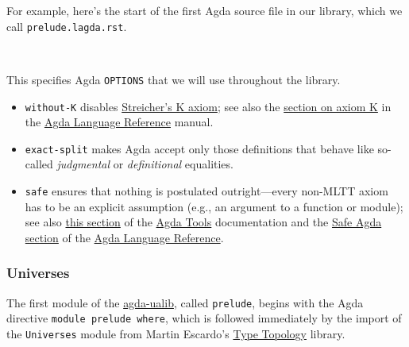 \documentclass[sigplan,screen]{acmart}
\newcommand{\agdaualib}{\href{https://ualib.org}{agda-ualib}\xspace}
\newcommand{\agdaualib}{\href{anonymizedLink/agda-ualib.html}{agda-ualib}\xspace}
\begin{document}
For example, here's the start of the first Agda source file in our library, which we call \texttt{prelude.lagda.rst}.
\begin{code}
\\[\AgdaEmptyExtraSkip]%
\>[0]\AgdaSymbol{\{-\#}\AgdaSpace{}%
\AgdaSpace{}%
\AgdaSpace{}%
\AgdaSpace{}%
\AgdaSpace{}%
\AgdaSymbol{\#-\}}\<%
\end{code}
This specifies Agda \texttt{OPTIONS} that we will use throughout the library.
\begin{itemize}
\item \texttt{without-K} disables \href{https://ncatlab.org/nlab/show/axiom+K+\%28type+theory\%29}{Streicher's K axiom}; see also the \href{https://agda.readthedocs.io/en/v2.6.1/language/without-k.html}{section on axiom K} in the \href{https://agda.readthedocs.io/en/v2.6.1/language}{Agda Language Reference} manual.
\item \texttt{exact-split} makes Agda accept only those definitions that behave like so-called \emph{judgmental} or \emph{definitional} equalities.
\item \texttt{safe} ensures that nothing is postulated outright---every non-MLTT axiom has to be an explicit assumption (e.g., an argument to a function or module); see also \href{https://agda.readthedocs.io/en/v2.6.1/tools/command-line-options.html\#cmdoption-safe}{this section} of the \href{https://agda.readthedocs.io/en/v2.6.1/tools/}{Agda Tools} documentation and the \href{https://agda.readthedocs.io/en/v2.6.1/language/safe-agda.html\#safe-agda}{Safe
  Agda section} of the \href{https://agda.readthedocs.io/en/v2.6.1/language}{Agda Language
  Reference}.
\end{itemize}

\subsubsection{Universes}\label{universes}
The first module of the \agdaualib, called \texttt{prelude}, begins with the Agda directive \texttt{module\ prelude\ where}, which is followed immediately by the import of the \texttt{Universes} module from Martin Escardo's \href{https://github.com/martinescardo/TypeTopology}{Type Topology} library.
\end{document}
